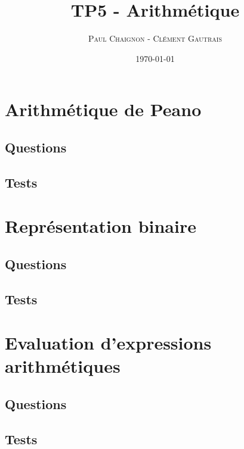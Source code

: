 \documentclass[a4paper,12pt]{article}
\title{TP5 - Arithmétique}
\author{\textsc{Paul Chaignon} - \textsc{Clément Gautrais}}
\date{\today}
\begin{document}
\maketitle

\section{Arithmétique de Peano}

\subsection{Questions}


\vspace{2cm}

\subsection{Tests}


\vspace{0.5cm}


\section{Représentation binaire}

\subsection{Questions}


\vspace{1cm}

\subsection{Tests}


\vspace{0.5cm}


\section{Evaluation d'expressions arithmétiques}

\subsection{Questions}


\vspace{1cm}

\subsection{Tests}


\vspace{0.5cm}
\end{document}
